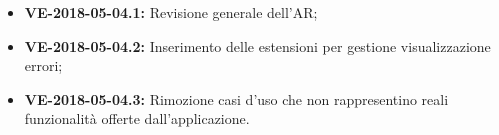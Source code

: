 \documentclass[openany,12pt,a4paper]{article}
\begin{document}
  \begin{itemize} 
  	
      \item \textbf{VE-2018-05-04.1:} Revisione generale dell'AR;
      \item \textbf{VE-2018-05-04.2:} Inserimento delle estensioni per gestione visualizzazione errori;
      \item \textbf{VE-2018-05-04.3:} Rimozione casi d'uso che non rappresentino reali funzionalità offerte dall'applicazione.
      
  \end{itemize} 
   
  
\end{document}
